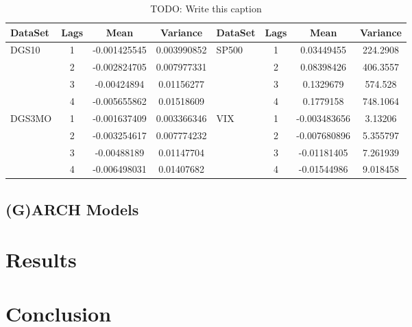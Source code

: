 \documentclass[a4paper, 11pt]{article}
\theoremstyle{definition} %
\numberwithin{equation}{section}
\begin{document}
    \begin{table}
    \label{tab:differences}
    \begin{tabular}{|l|c|cc||l|c|cc|}
      \hline
       \rowcolor{teal!45} DataSet & Lags &   Mean &     Variance & DataSet & Lags &   Mean &     Variance \\
      \hline
      \hline
       \rowcolor{teal!7} DGS10  & 1    & -0.001425545 &  0.003990852 & SP500  & 1    &   0.03449455 &  224.2908 \\
       \rowcolor{teal!23} {} &     2    & -0.002824705 &  0.007977331 & {} &     2    &   0.08398426 &  406.3557 \\
       \rowcolor{teal!7} {} &     3    &  -0.00424894 &   0.01156277 & {} &      3    &    0.1329679 &   574.528 \\
       \rowcolor{teal!23} {} &     4    & -0.005655862 &   0.01518609 & {} &     4    &    0.1779158 &  748.1064 \\
       \rowcolor{teal!7} DGS3MO &  1    & -0.001637409 &  0.003366346 & VIX    & 1    & -0.003483656 &   3.13206 \\
       \rowcolor{teal!23} {} &     2    & -0.003254617 &  0.007774232 & {} &     2    & -0.007680896 &  5.355797 \\
       \rowcolor{teal!7} {} &     3    &  -0.00488189 &   0.01147704 & {} &     3    &  -0.01181405 &  7.261939 \\
       \rowcolor{teal!23} {} &     4    & -0.006498031 &   0.01407682 & {} &     4    &  -0.01544986 &  9.018458 \\
      \hline
    \end{tabular}
    \caption{TODO: Write this caption}
    \end{table}

  \subsection{(G)ARCH Models} \label{sub:garch}

\section{Results} \label{sec:results}

\section{Conclusion} \label{sec:conclusion}

\newpage


\end{document}
